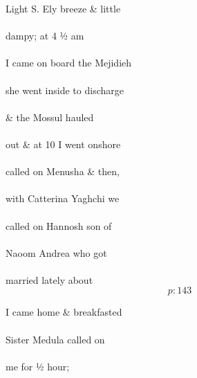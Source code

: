 \documentclass{report}
\begin{document}
	\par{
 	Light S. Ely breeze \& little\ \\\ \\dampy; at 4 ½ am\ \\\ \\I came on board the Mejidieh\ \\\ \\she went inside to discharge\ \\\ \\\& the Mossul hauled\ \\\ \\out \& at 10 I went onshore\ \\\ \\called on Menusha \& then,\ \\\ \\with Catterina Yaghchi we\ \\\ \\called on Hannosh son of\ \\\ \\Naoom Andrea who got\ \\\ \\married lately about\ \\
  \[p: 143 \]

	}




	\par{
 	I came home \& breakfasted\ \\\ \\Sister Medula called on\ \\\ \\me for ½ hour;\ \\\ \\
	}
\end{document}
